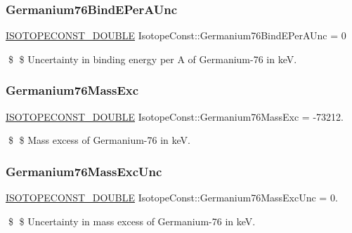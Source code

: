 \subsubsection{\texorpdfstring{Germanium76\+Bind\+E\+Per\+A\+Unc}{Germanium76BindEPerAUnc}}
{\footnotesize\ttfamily \mbox{\hyperlink{group___isotope_const-_macros_ga8f45a7272ce02c0b4c65c44636ed719a}{I\+S\+O\+T\+O\+P\+E\+C\+O\+N\+S\+T\+\_\+\+D\+O\+U\+B\+LE}} Isotope\+Const\+::\+Germanium76\+Bind\+E\+Per\+A\+Unc = 0}

\$ \$ Uncertainty in binding energy per A of Germanium-\/76 in keV. \mbox{\label{group___isotope_const-_germanium-_ge76_ga38d3ba0dd0d9dd46c1391a6d399b5bb4}} 
\subsubsection{\texorpdfstring{Germanium76\+Mass\+Exc}{Germanium76MassExc}}
{\footnotesize\ttfamily \mbox{\hyperlink{group___isotope_const-_macros_ga8f45a7272ce02c0b4c65c44636ed719a}{I\+S\+O\+T\+O\+P\+E\+C\+O\+N\+S\+T\+\_\+\+D\+O\+U\+B\+LE}} Isotope\+Const\+::\+Germanium76\+Mass\+Exc = -\/73212.}

\$ \$ Mass excess of Germanium-\/76 in keV. \mbox{\label{group___isotope_const-_germanium-_ge76_gaca2bd29a9556333a7c83be50de931195}} 
\subsubsection{\texorpdfstring{Germanium76\+Mass\+Exc\+Unc}{Germanium76MassExcUnc}}
{\footnotesize\ttfamily \mbox{\hyperlink{group___isotope_const-_macros_ga8f45a7272ce02c0b4c65c44636ed719a}{I\+S\+O\+T\+O\+P\+E\+C\+O\+N\+S\+T\+\_\+\+D\+O\+U\+B\+LE}} Isotope\+Const\+::\+Germanium76\+Mass\+Exc\+Unc = 0.}

\$ \$ Uncertainty in mass excess of Germanium-\/76 in keV. \mbox{\label{group___isotope_const-_germanium-_ge76_ga0f41cf80072dd6011f30625a9f236fae}} 
